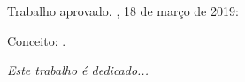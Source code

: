 \documentclass[
	12pt,				%
	openright,			%
	oneside,			%
	a4paper,			%
	english,			%
	brazil				%
	]{abntex2}
\begin{document}
%
% 
%
\begin{folhadeaprovacao}

  \begin{center}
    {\ABNTEXchapterfont\large\imprimirautor}

    \vspace*{\fill}\vspace*{\fill}
    \begin{center}
      \ABNTEXchapterfont\bfseries\Large\imprimirtitulo
    \end{center}
    \vspace*{\fill}
    
    \hspace{.45\textwidth}
    \begin{minipage}{.5\textwidth}
        \imprimirpreambulo
    \end{minipage}%
    \vspace*{\fill}
   \end{center}
        
   Trabalho aprovado. \imprimirlocal, 18 de março de 2019:

   Conceito: .
   
      
   \begin{center}
    \vspace*{0.5cm}
    {\large\imprimirlocal}
    \par
    {\large\imprimirdata}
    \vspace*{1cm}
  \end{center}
  
\end{folhadeaprovacao}

\begin{dedicatoria}
   \vspace*{\fill}
   \centering
   \noindent
   \textit{ Este trabalho é dedicado...} \vspace*{\fill}
\end{dedicatoria}
\end{document}
